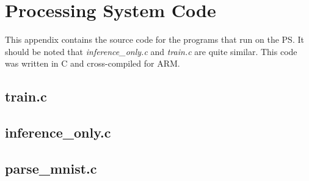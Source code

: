 \chapter{Processing System Code}\label{app:ps}
This appendix contains the source code for the programs that run on the PS. It should be noted that \textit{inference\_only.c} and \textit{train.c} are quite similar. This code was written in C and cross-compiled for ARM.
\section{train.c}

\pagebreak

\section{inference\_only.c}

\pagebreak

\section{parse\_mnist.c}

\pagebreak